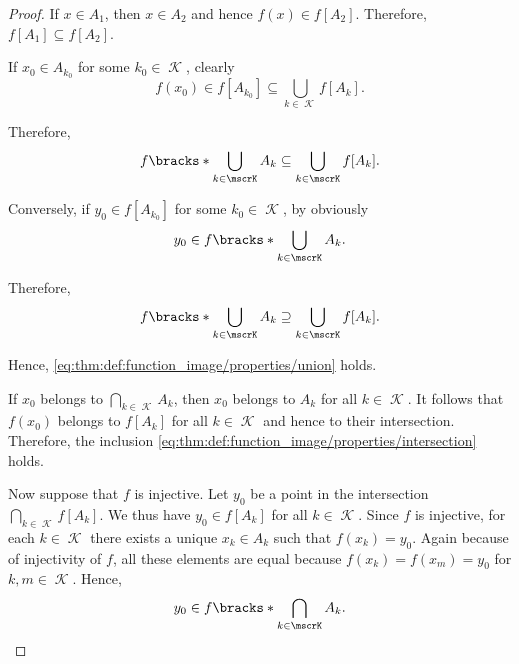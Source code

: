 \begin{proof}
   If \( x \in A_1 \), then \( x \in A_2 \) and hence \( f(x) \in f[A_2] \). Therefore, \( f[A_1] \subseteq f[A_2] \).

   If \( x_0 \in A_{k_0} \) for some \( k_0 \in \mscrK \), clearly
  \begin{equation*}
    f(x_0) \in f[A_{k_0}] \subseteq \bigcup_{k \in \mscrK} f[A_k].
  \end{equation*}

  Therefore,
  \begin{equation*}
    f\bracks*{ \bigcup_{k \in \mscrK} A_k } \subseteq \bigcup_{k \in \mscrK} f[A_k].
  \end{equation*}

  Conversely, if \( y_0 \in f[A_{k_0}] \) for some \( k_0 \in \mscrK \), by  obviously
  \begin{equation*}
    y_0 \in f\bracks*{ \bigcup_{k \in \mscrK} A_k }.
  \end{equation*}

  Therefore,
  \begin{equation*}
    f\bracks*{ \bigcup_{k \in \mscrK} A_k } \supseteq \bigcup_{k \in \mscrK} f[A_k].
  \end{equation*}

  Hence, \eqref{eq:thm:def:function_image/properties/union} holds.

   If \( x_0 \) belongs to \( \bigcap_{k \in \mscrK} A_k \), then \( x_0 \) belongs to \( A_k \) for all \( k \in \mscrK \). It follows that \( f(x_0) \) belongs to \( f[A_k] \) for all \( k \in \mscrK \) and hence to their intersection. Therefore, the inclusion \eqref{eq:thm:def:function_image/properties/intersection} holds.

  Now suppose that \( f \) is injective. Let \( y_0 \) be a point in the intersection \( \bigcap_{k \in \mscrK} f[A_k] \). We thus have \( y_0 \in f[A_k] \) for all \( k \in \mscrK \). Since \( f \) is injective, for each \( k \in \mscrK \) there exists a unique \( x_k \in A_k \) such that \( f(x_k) = y_0 \). Again because of injectivity of \( f \), all these elements are equal because \( f(x_k) = f(x_m) = y_0 \) for \( k, m \in \mscrK \). Hence,
  \begin{equation*}
    y_0 \in f\bracks*{ \bigcap_{k \in \mscrK} A_k }.
  \end{equation*}


\end{proof}
